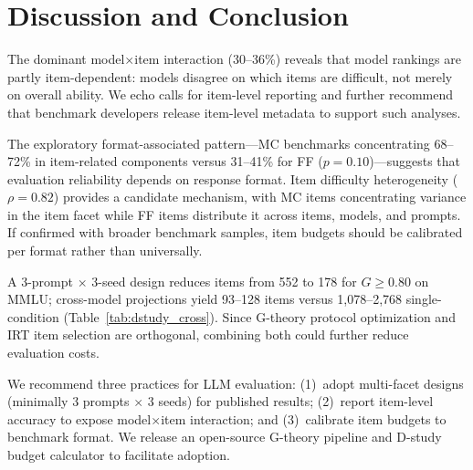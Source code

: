 \section{Discussion and Conclusion}
\label{sec:conclusion}

The dominant model$\times$item interaction (30--36\%) reveals that model rankings are partly item-dependent: models disagree on which items are difficult, not merely on overall ability. We echo calls for item-level reporting \cite{polo2024tinybenchmarks} and further recommend that benchmark developers release item-level metadata to support such analyses.

The exploratory format-associated pattern---MC benchmarks concentrating 68--72\% in item-related components versus 31--41\% for FF ($p = 0.10$)---suggests that evaluation reliability depends on response format. Item difficulty heterogeneity ($\rho = 0.82$) provides a candidate mechanism, with MC items concentrating variance in the item facet while FF items distribute it across items, models, and prompts. If confirmed with broader benchmark samples, item budgets should be calibrated per format rather than universally.

A 3-prompt $\times$ 3-seed design reduces items from 552 to 178 for $G \geq 0.80$ on MMLU; cross-model projections yield 93--128 items versus 1,078--2,768 single-condition (Table~\ref{tab:dstudy_cross}). Since G-theory protocol optimization and IRT item selection are orthogonal, combining both could further reduce evaluation costs.

We recommend three practices for LLM evaluation: (1)~adopt multi-facet designs (minimally 3 prompts $\times$ 3 seeds) for published results; (2)~report item-level accuracy to expose model$\times$item interaction; and (3)~calibrate item budgets to benchmark format. We release an open-source G-theory pipeline and D-study budget calculator to facilitate adoption.
